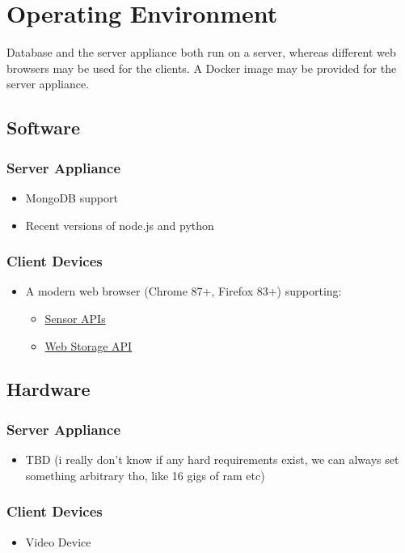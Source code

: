 \section{Operating Environment}
Database and the server appliance both run on a server, whereas different web browsers may be used for the clients. A Docker image may be provided for the server appliance.

\subsection{Software}
\subsubsection{Server Appliance}
\begin{itemize}
    \item MongoDB support
    \item Recent versions of node.js and python %
\end{itemize}
\subsubsection{Client Devices}
\begin{itemize}
    \item A modern web browser (Chrome 87+, Firefox 83+) supporting:
    \begin{itemize}
        \item \href{https://developer.mozilla.org/en-US/docs/Web/API/Sensor_APIs}{Sensor APIs}
        \item \href{https://developer.mozilla.org/en-US/docs/Web/API/Web_Storage_API}{Web Storage API}
    \end{itemize}
\end{itemize}

\subsection{Hardware}
\subsubsection{Server Appliance}
\begin{itemize}
    \item TBD (i really don't know if any hard requirements exist, we can always set something arbitrary tho, like 16 gigs of ram etc)
\end{itemize}
\subsubsection{Client Devices}
\begin{itemize}
    \item Video Device
\end{itemize}
